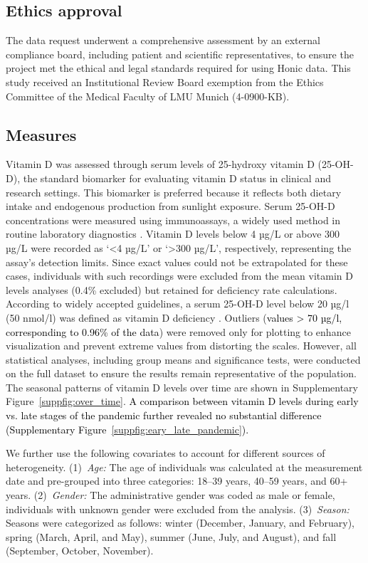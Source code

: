 \documentclass[12pt]{article}
\newcommand{\REV}[1]{\textcolor{black}{#1}}
\begin{document}
\subsection*{Ethics approval}

The data request underwent a comprehensive assessment by an external compliance board, including patient and scientific representatives, to ensure the project met the ethical and legal standards required for using Honic data. This study received an Institutional Review Board exemption from the Ethics Committee of the Medical Faculty of LMU Munich (4-0900-KB). 

 
\subsection*{Measures}

Vitamin D was assessed through serum levels of 25-hydroxy vitamin D (25-OH-D), the standard biomarker for evaluating vitamin D status in clinical and research settings. This biomarker is preferred because it reflects both dietary intake and endogenous production from sunlight exposure. Serum 25-OH-D concentrations were measured using immunoassays, a widely used method in routine laboratory diagnostics \cite{Rabenberg2018, Fraser2020}. Vitamin D levels below 4 µg/L or above 300 µg/L were recorded as `<4 µg/L' or `>300 µg/L', respectively, representing the assay's detection limits. Since exact values could not be extrapolated for these cases, individuals with such recordings were excluded from the mean vitamin D levels analyses (0.4\% excluded) but retained for deficiency rate calculations. According to widely accepted guidelines, a serum 25-OH-D level below 20 µg/l (50 nmol/l) was defined as vitamin D deficiency \cite{Holick2011, Pludowski2013}. Outliers (\REV{values > 70 µg/l, corresponding to 0.96\% of the data}) were removed only for plotting to enhance visualization and prevent extreme values from distorting the scales. However, all statistical analyses, including group means and significance tests, were conducted on the full dataset to ensure the results remain representative of the population. The seasonal patterns of vitamin D levels over time are shown in Supplementary Figure~\ref{suppfig:over_time}. \REV{A comparison between vitamin D levels during early vs. late stages of the pandemic further revealed no substantial difference (Supplementary Figure~\ref{suppfig:eary_late_pandemic}).} 

We further use the following covariates to account for different sources of heterogeneity. (1)~\emph{Age:} The age of individuals was calculated at the measurement date and pre-grouped into three categories: 18--39 years, 40--59 years, and 60+ years. (2)~\emph{Gender:} The administrative gender was coded as male or female, individuals with unknown gender were excluded from the analysis. (3)~\emph{Season:} Seasons were categorized as follows: winter (December, January, and February), spring (March, April, and May), summer (June, July, and August), and fall (September, October, November).
\end{document}
